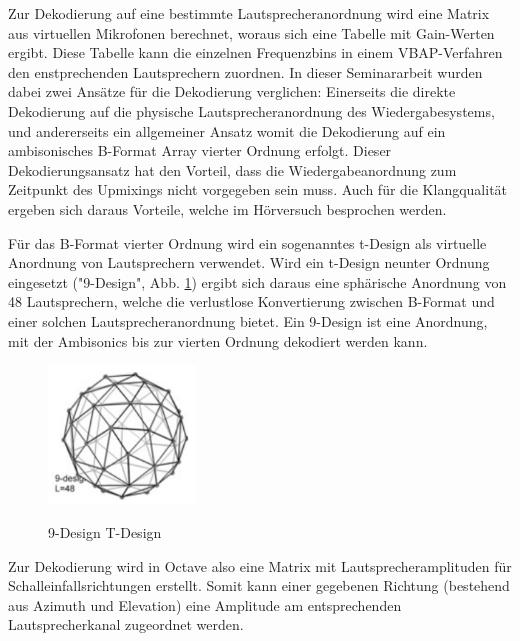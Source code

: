 Zur Dekodierung auf eine bestimmte Lautsprecheranordnung wird eine Matrix aus virtuellen Mikrofonen berechnet, woraus sich eine Tabelle mit Gain-Werten ergibt. Diese Tabelle kann die einzelnen Frequenzbins in einem VBAP-Verfahren den enstprechenden Lautsprechern zuordnen. In dieser Seminararbeit wurden dabei zwei Ansätze für die Dekodierung verglichen: Einerseits die direkte Dekodierung auf die physische Lautsprecheranordnung des Wiedergabesystems, und andererseits ein allgemeiner Ansatz womit die Dekodierung auf ein ambisonisches B-Format Array vierter Ordnung erfolgt. Dieser Dekodierungsansatz hat den Vorteil, dass die Wiedergabeanordnung zum Zeitpunkt des Upmixings nicht vorgegeben sein muss. Auch für die Klangqualität ergeben sich daraus Vorteile, welche im Hörversuch besprochen werden.

Für das B-Format vierter Ordnung wird ein sogenanntes t-Design als virtuelle Anordnung von Lautsprechern verwendet. Wird ein t-Design neunter Ordnung eingesetzt ("9-Design", Abb. \ref{fig:tdesign}) ergibt sich daraus eine sphärische Anordnung von 48 Lautsprechern, welche die verlustlose Konvertierung zwischen B-Format und einer solchen Lautsprecheranordnung bietet. Ein 9-Design ist eine Anordnung, mit der Ambisonics bis zur vierten Ordnung dekodiert werden kann.

\begin{figure}[!ht]
  \centering
  \includegraphics[width=0.35\textwidth]{implementierung/plots/t-design.png}
  \label{fig:tdesign}
  \caption{9-Design T-Design\protect\footnotemark}
\end{figure}


Zur Dekodierung wird in Octave also eine Matrix mit Lautsprecheramplituden für Schalleinfallsrichtungen erstellt. Somit kann einer gegebenen Richtung (bestehend aus Azimuth und Elevation) eine Amplitude am entsprechenden Lautsprecherkanal zugeordnet werden.
